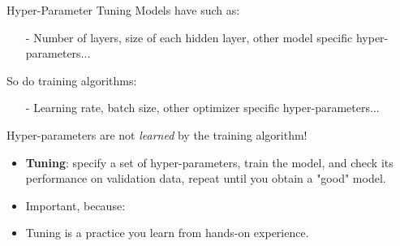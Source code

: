 \begin{frame}{Hyper-Parameter Tuning}
 Models have  such as:
 \begin{itemize}
 \item[-] Number of layers, size of each hidden layer, other model specific hyper-parameters...
 \end{itemize}
\pause
\vsp
So do training algorithms:
 \begin{itemize}
 \item[-] Learning rate, batch size, other optimizer specific hyper-parameters...
 \end{itemize}
\pause
\vsp
Hyper-parameters are not \textit{learned} by the training algorithm!
 \begin{itemize}
 \item \textbf{Tuning}: specify a set of hyper-parameters, train the model, and check its performance on validation data, repeat until you obtain a "good" model.
\item Important, because: 
 \item Tuning is a practice you learn from hands-on experience.
 \end{itemize}

\end{frame}

